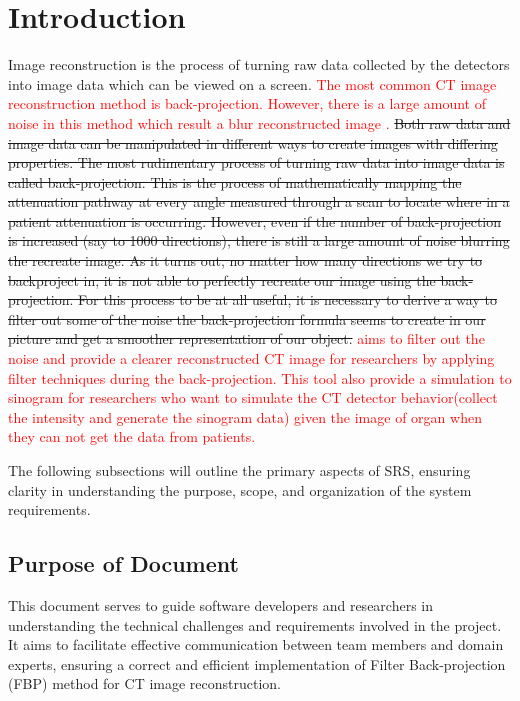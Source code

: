 \documentclass[12pt]{article}
\newcommand{\add}{\textcolor{red}}
\begin{document}
\newpage

\section{Introduction} \label{introduction}
Image reconstruction is the process of turning raw data collected by the
detectors into image data which can be viewed on a screen. \add{The most common
  CT image reconstruction method is back-projection. However, there is a large
  amount of noise in this method which result a blur reconstructed image
  \cite{Beatty2012}.} \st{Both raw data and image data can be manipulated in
  different ways to create images with differing properties. The most
  rudimentary process of turning raw data into image data is called
  back-projection. This is the process of mathematically mapping the attenuation
  pathway at every angle measured through a scan to locate where in a patient
  attenuation is occurring. However, even if the number of back-projection is
  increased (say to 1000 directions), there is still a large amount of noise
  blurring the recreate image. As it turns out, no matter how many directions we
  try to backproject in, it is not able to perfectly recreate our image using
  the back-projection. For this process to be at all useful, it is necessary to
  derive a way to filter out some of the noise the back-projection formula seems
  to create in our picture and get a smoother representation of our object.}
\add{\progname aims to filter out the noise and provide a clearer reconstructed CT image for
  researchers by applying filter techniques during the back-projection. This
  tool also provide a simulation to sinogram for researchers who want to
  simulate the CT detector behavior(collect the intensity and generate the
  sinogram data) given the image of organ when they can not get the data from patients.}

The following subsections will outline the primary aspects of SRS,
ensuring clarity in understanding the \progname purpose, scope, and organization of the
system requirements.

\subsection{Purpose of Document}
This document serves to guide software developers and researchers in
understanding the technical challenges and requirements involved in the project.
It aims to facilitate effective communication between team members and domain
experts, ensuring a correct and efficient implementation of Filter
Back-projection (FBP) method for CT image reconstruction.
\end{document}
